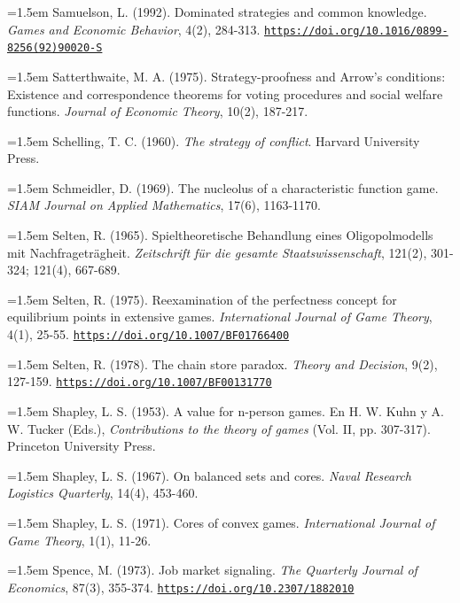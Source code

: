 \documentclass[10pt,a4paper]{article}
\begin{document}
\noindent\hangindent=1.5em Samuelson, L. (1992). Dominated strategies and common knowledge. \textit{Games and Economic Behavior}, 4(2), 284-313. \href{https://doi.org/10.1016/0899-8256(92)90020-S}{\nolinkurl{https://doi.org/10.1016/0899-8256(92)90020-S}}

\noindent\hangindent=1.5em Satterthwaite, M. A. (1975). Strategy-proofness and Arrow’s conditions: Existence and correspondence theorems for voting procedures and social welfare functions. \textit{Journal of Economic Theory}, 10(2), 187-217.

\noindent\hangindent=1.5em Schelling, T. C. (1960). \textit{The strategy of conflict}. Harvard University Press.

\noindent\hangindent=1.5em Schmeidler, D. (1969). The nucleolus of a characteristic function game. \textit{SIAM Journal on Applied Mathematics}, 17(6), 1163-1170.

\noindent\hangindent=1.5em Selten, R. (1965). Spieltheoretische Behandlung eines Oligopolmodells mit Nachfrageträgheit. \textit{Zeitschrift für die gesamte Staatswissenschaft}, 121(2), 301-324; 121(4), 667-689.

\noindent\hangindent=1.5em Selten, R. (1975). Reexamination of the perfectness concept for equilibrium points in extensive games. \textit{International Journal of Game Theory}, 4(1), 25-55. \href{https://doi.org/10.1007/BF01766400}{\nolinkurl{https://doi.org/10.1007/BF01766400}}

\noindent\hangindent=1.5em Selten, R. (1978). The chain store paradox. \textit{Theory and Decision}, 9(2), 127-159. \href{https://doi.org/10.1007/BF00131770}{\nolinkurl{https://doi.org/10.1007/BF00131770}}

\noindent\hangindent=1.5em Shapley, L. S. (1953). A value for n-person games. En H. W. Kuhn y A. W. Tucker (Eds.), \textit{Contributions to the theory of games} (Vol. II, pp. 307-317). Princeton University Press.

\noindent\hangindent=1.5em Shapley, L. S. (1967). On balanced sets and cores. \textit{Naval Research Logistics Quarterly}, 14(4), 453-460.

\noindent\hangindent=1.5em Shapley, L. S. (1971). Cores of convex games. \textit{International Journal of Game Theory}, 1(1), 11-26.

\noindent\hangindent=1.5em Spence, M. (1973). Job market signaling. \textit{The Quarterly Journal of Economics}, 87(3), 355-374. \href{https://doi.org/10.2307/1882010}{\nolinkurl{https://doi.org/10.2307/1882010}}
\end{document}
